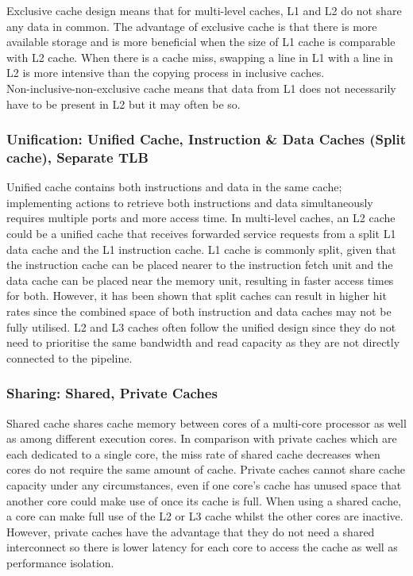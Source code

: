 \documentclass[a4paper, 12pt, oneside]{book}
\begin{document}
Exclusive cache design means that for multi-level caches, L1 and L2 do not share any data in common. The advantage of exclusive cache is that there is more available storage and is more beneficial when the size of L1 cache is comparable with L2 cache. When there is a cache miss, swapping a line in L1 with a line in L2 is more intensive than the copying process in inclusive caches.\\

Non-inclusive-non-exclusive cache means that data from L1 does not necessarily have to be present in L2 but it may often be so.

\subsubsection{Unification: Unified Cache, Instruction \& Data Caches (Split cache), Separate TLB}

Unified cache contains both instructions and data in the same cache; implementing actions to retrieve both instructions and data simultaneously requires multiple ports and more access time. In multi-level caches, an L2 cache could be a unified cache that receives forwarded service requests from a split L1 data cache and the L1 instruction cache. L1 cache is commonly split, given that the instruction cache can be placed nearer to the instruction fetch unit and the data cache can be placed near the memory unit, resulting in faster access times for both. However, it has been shown that split caches can result in higher hit rates since the combined space of both instruction and data caches may not be fully utilised. L2 and L3 caches often follow the unified design since they do not need to prioritise the same bandwidth and read capacity as they are not directly connected to the pipeline.

\subsubsection{Sharing: Shared, Private Caches}

Shared cache shares cache memory between cores of a multi-core processor as well as among different execution cores. In comparison with private caches which are each dedicated to a single core, the miss rate of shared cache decreases when cores do not require the same amount of cache. Private caches cannot share cache capacity under any circumstances, even if one core's cache has unused space that another core could make use of once its cache is full. When using a shared cache, a core can make full use of the L2 or L3 cache whilst the other cores are inactive. However, private caches have the advantage that they do not need a shared interconnect so there is lower latency for each core to access the cache as well as performance isolation.
\end{document}
